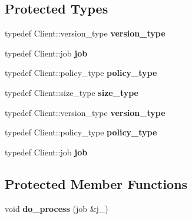 \subsection*{Protected Types}
\begin{DoxyCompactItemize}
\item 
\hypertarget{classClientBase_a3aee12354b8dc46ac41b027a38dfed9f}{}typedef Client\+::version\+\_\+type {\bfseries version\+\_\+type}\label{classClientBase_a3aee12354b8dc46ac41b027a38dfed9f}

\item 
\hypertarget{classClientBase_a834359c26532db38c369e99544e86424}{}typedef Client\+::job {\bfseries job}\label{classClientBase_a834359c26532db38c369e99544e86424}

\item 
\hypertarget{classClientBase_a40d220fc1bef3d85ea8932cc2170d184}{}typedef Client\+::policy\+\_\+type {\bfseries policy\+\_\+type}\label{classClientBase_a40d220fc1bef3d85ea8932cc2170d184}

\item 
\hypertarget{classClientBase_a3fb9b8d35c124fde0cded67440384696}{}typedef Client\+::size\+\_\+type {\bfseries size\+\_\+type}\label{classClientBase_a3fb9b8d35c124fde0cded67440384696}

\item 
\hypertarget{classClientBase_a3aee12354b8dc46ac41b027a38dfed9f}{}typedef Client\+::version\+\_\+type {\bfseries version\+\_\+type}\label{classClientBase_a3aee12354b8dc46ac41b027a38dfed9f}

\item 
\hypertarget{classClientBase_a40d220fc1bef3d85ea8932cc2170d184}{}typedef Client\+::policy\+\_\+type {\bfseries policy\+\_\+type}\label{classClientBase_a40d220fc1bef3d85ea8932cc2170d184}

\item 
\hypertarget{classClientBase_a834359c26532db38c369e99544e86424}{}typedef Client\+::job {\bfseries job}\label{classClientBase_a834359c26532db38c369e99544e86424}

\end{DoxyCompactItemize}
\subsection*{Protected Member Functions}
\begin{DoxyCompactItemize}
\item 
\hypertarget{classClientBase_a89dbe78487bc4f0cb76af6a33551fd89}{}void {\bfseries do\+\_\+process} (job \&j\+\_\+)\label{classClientBase_a89dbe78487bc4f0cb76af6a33551fd89}

\end{DoxyCompactItemize}



